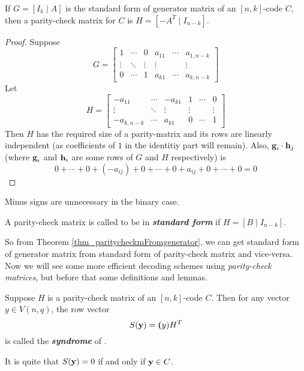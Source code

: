 \documentclass[../main.tex]{subfiles}
\begin{document}
\begin{thm}\label{thm_paritycheckmFromgenerator}
	If $G=[I_k \;|\; A]$ is the standard form of generator matrix of an $[n,k]$-code $C$, then a parity-check matrix for $C$ is $H=[-A^T \;|\; I_{n-k}]$.
\end{thm}
\begin{proof}
	Suppose
	\[
		G=	\left[
			\begin{array}{ccc|ccc}
			1 & \cdots  & 0 & a_{11} & \cdots & a_{1,n-k}\\
			\vdots & \ddots & \vdots & \vdots & & \vdots\\
			0 & \cdots & 1 & a_{k1} & \cdots & a_{k,n-k}
			\end{array}
			\right]
	\]
	Let
	\[
		H = \left[
			\begin{array}{ccc|ccc}
			-a_{11} & \cdots  & -a_{k1} & 1 & \cdots & 0\\
			\vdots & \ddots & \vdots & \vdots & & \vdots\\
			-a_{k,n-k} & \cdots & a_{k1} & 0 & \cdots & 1
			\end{array}
			\right]
	\]
	Then $H$ has the required size of a parity-matrix and its rows are linearly independent (as coefficients of $1$ in the identitiy part will remain). Also, $\textbf{g}_i\cdot \textbf{h}_j$ (where $\textbf{g}_i$ and $\textbf{h}_i$ are some rows of $G$ and $H$ respectively) is
	\[
		0+\cdots+0+(-a_{ij})+0+\cdots+0+a_{ij}+0+\cdots+0 = 0
	\]
\end{proof}
\begin{remark}
	Minus signs are unnecessary in the binary case.
\end{remark}

\begin{defn}
	A parity-check matrix is called to be in \textbf{\emph{standard form}} if $H=[B \;|\; I_{n-k}]$.
\end{defn}
So from Theorem \ref{thm_paritycheckmFromgenerator}, we can get standard form of generator matrix from standard form of parity-check matrix and vice-versa.\\

Now we will see some more efficient decoding schemes using \emph{parity-check matrices}, but before that some definitions and lemmas.

\begin{defn}
	Suppose $H$ is a parity-check matrix of an $[n,k]$-code $C$. Then for any vector $y\in V(n,q)$, the row vector
	\[
		S(\textbf{y})= \textbf{(}y)H^T
	\]
	is called the \textbf{\emph{syndrome}} of .
\end{defn}
It is quite that $S(\textbf{y})=0$ if and only if $\textbf{y}\in C$.
\end{document}
